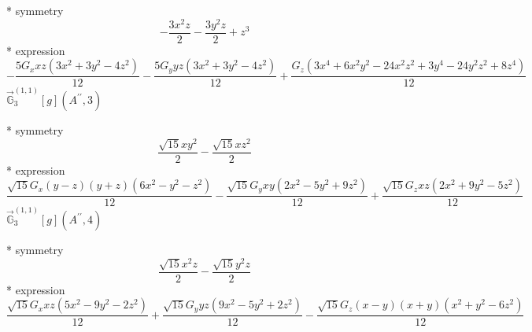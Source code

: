 \documentclass[fleqn,8pt]{jsarticle}
\begin{document}
\noindent\quad ** symmetry
\begin{dmath*}
- \frac{3 x^{2} z}{2} - \frac{3 y^{2} z}{2} + z^{3}
\end{dmath*}
\noindent\quad ** expression
\begin{dmath*}
- \frac{5 G_{x} x z \left(3 x^{2} + 3 y^{2} - 4 z^{2}\right)}{12} - \frac{5 G_{y} y z \left(3 x^{2} + 3 y^{2} - 4 z^{2}\right)}{12} + \frac{G_{z} \left(3 x^{4} + 6 x^{2} y^{2} - 24 x^{2} z^{2} + 3 y^{4} - 24 y^{2} z^{2} + 8 z^{4}\right)}{12}
\end{dmath*}
\noindent\quad $\vec{\mathbb{G}}_{3}^{(1,1)}[g](A^{\prime\prime},3)$

\noindent\quad ** symmetry
\begin{dmath*}
\frac{\sqrt{15} x y^{2}}{2} - \frac{\sqrt{15} x z^{2}}{2}
\end{dmath*}
\noindent\quad ** expression
\begin{dmath*}
\frac{\sqrt{15} G_{x} \left(y - z\right) \left(y + z\right) \left(6 x^{2} - y^{2} - z^{2}\right)}{12} - \frac{\sqrt{15} G_{y} x y \left(2 x^{2} - 5 y^{2} + 9 z^{2}\right)}{12} + \frac{\sqrt{15} G_{z} x z \left(2 x^{2} + 9 y^{2} - 5 z^{2}\right)}{12}
\end{dmath*}
\noindent\quad $\vec{\mathbb{G}}_{3}^{(1,1)}[g](A^{\prime\prime},4)$

\noindent\quad ** symmetry
\begin{dmath*}
\frac{\sqrt{15} x^{2} z}{2} - \frac{\sqrt{15} y^{2} z}{2}
\end{dmath*}
\noindent\quad ** expression
\begin{dmath*}
\frac{\sqrt{15} G_{x} x z \left(5 x^{2} - 9 y^{2} - 2 z^{2}\right)}{12} + \frac{\sqrt{15} G_{y} y z \left(9 x^{2} - 5 y^{2} + 2 z^{2}\right)}{12} - \frac{\sqrt{15} G_{z} \left(x - y\right) \left(x + y\right) \left(x^{2} + y^{2} - 6 z^{2}\right)}{12}
\end{dmath*}
\end{document}
